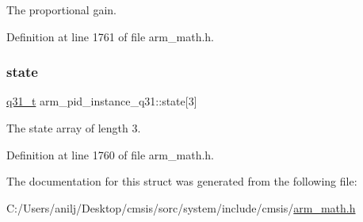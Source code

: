 The proportional gain. 

Definition at line 1761 of file arm\+\_\+math.\+h.

\mbox{\label{structarm__pid__instance__q31_a228e4a64da6014844a0a671a1fa391d4}} 
\subsubsection{\texorpdfstring{state}{state}}
{\footnotesize\ttfamily \hyperlink{arm__math_8h_adc89a3547f5324b7b3b95adec3806bc0}{q31\+\_\+t} arm\+\_\+pid\+\_\+instance\+\_\+q31\+::state\mbox{[}3\mbox{]}}

The state array of length 3. 

Definition at line 1760 of file arm\+\_\+math.\+h.



The documentation for this struct was generated from the following file\+:\begin{DoxyCompactItemize}
\item 
C\+:/\+Users/anilj/\+Desktop/cmsis/sorc/system/include/cmsis/\hyperlink{arm__math_8h}{arm\+\_\+math.\+h}\end{DoxyCompactItemize}
